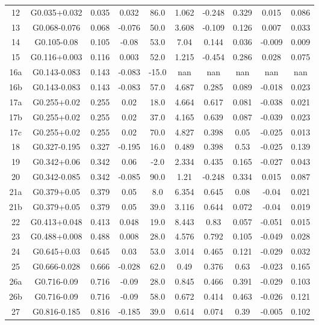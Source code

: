 \begin{table}
\begin{tabular}{cccccccccc}
12 & G0.035+0.032 & 0.035 & 0.032 & 86.0 & 1.062 & -0.248 & 0.329 & 0.015 & 0.086 \\
13 & G0.068-0.076 & 0.068 & -0.076 & 50.0 & 3.608 & -0.109 & 0.126 & 0.007 & 0.033 \\
14 & G0.105-0.08 & 0.105 & -0.08 & 53.0 & 7.04 & 0.144 & 0.036 & -0.009 & 0.009 \\
15 & G0.116+0.003 & 0.116 & 0.003 & 52.0 & 1.215 & -0.454 & 0.286 & 0.028 & 0.075 \\
16a & G0.143-0.083 & 0.143 & -0.083 & -15.0 & nan & nan & nan & nan & nan \\
16b & G0.143-0.083 & 0.143 & -0.083 & 57.0 & 4.687 & 0.285 & 0.089 & -0.018 & 0.023 \\
17a & G0.255+0.02 & 0.255 & 0.02 & 18.0 & 4.664 & 0.617 & 0.081 & -0.038 & 0.021 \\
17b & G0.255+0.02 & 0.255 & 0.02 & 37.0 & 4.165 & 0.639 & 0.087 & -0.039 & 0.023 \\
17c & G0.255+0.02 & 0.255 & 0.02 & 70.0 & 4.827 & 0.398 & 0.05 & -0.025 & 0.013 \\
18 & G0.327-0.195 & 0.327 & -0.195 & 16.0 & 0.489 & 0.398 & 0.53 & -0.025 & 0.139 \\
19 & G0.342+0.06 & 0.342 & 0.06 & -2.0 & 2.334 & 0.435 & 0.165 & -0.027 & 0.043 \\
20 & G0.342-0.085 & 0.342 & -0.085 & 90.0 & 1.21 & -0.248 & 0.334 & 0.015 & 0.087 \\
21a & G0.379+0.05 & 0.379 & 0.05 & 8.0 & 6.354 & 0.645 & 0.08 & -0.04 & 0.021 \\
21b & G0.379+0.05 & 0.379 & 0.05 & 39.0 & 3.116 & 0.644 & 0.072 & -0.04 & 0.019 \\
22 & G0.413+0.048 & 0.413 & 0.048 & 19.0 & 8.443 & 0.83 & 0.057 & -0.051 & 0.015 \\
23 & G0.488+0.008 & 0.488 & 0.008 & 28.0 & 4.576 & 0.792 & 0.105 & -0.049 & 0.028 \\
24 & G0.645+0.03 & 0.645 & 0.03 & 53.0 & 3.014 & 0.465 & 0.121 & -0.029 & 0.032 \\
25 & G0.666-0.028 & 0.666 & -0.028 & 62.0 & 0.49 & 0.376 & 0.63 & -0.023 & 0.165 \\
26a & G0.716-0.09 & 0.716 & -0.09 & 28.0 & 0.845 & 0.466 & 0.391 & -0.029 & 0.103 \\
26b & G0.716-0.09 & 0.716 & -0.09 & 58.0 & 0.672 & 0.414 & 0.463 & -0.026 & 0.121 \\
27 & G0.816-0.185 & 0.816 & -0.185 & 39.0 & 0.614 & 0.074 & 0.39 & -0.005 & 0.102 \\

\end{tabular}
\end{table}
